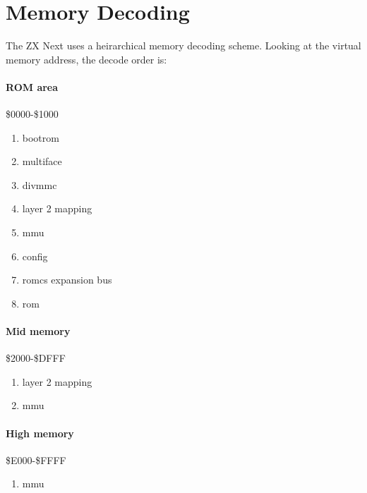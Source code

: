 \section{Memory Decoding}

The ZX Next uses a heirarchical memory decoding scheme. Looking at the
virtual memory address, the decode order is:

\paragraph{ROM area} \$0000-\$1000

\begin{enumerate}
\item bootrom
\item multiface
\item divmmc
\item layer 2 mapping
\item mmu
\item config
\item romcs expansion bus
\item rom
\end{enumerate}

\paragraph{Mid memory} \$2000-\$DFFF

\begin{enumerate}
\item layer 2 mapping
\item mmu
\end{enumerate}

\paragraph{High memory} \$E000-\$FFFF

\begin{enumerate}
\item mmu
\end{enumerate}
